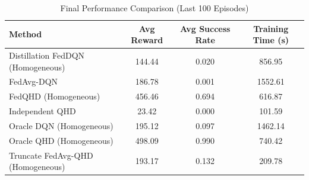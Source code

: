 \begin{table}[t]
\centering
\caption{Final Performance Comparison (Last 100 Episodes)}
\label{tab:performance_summary}
\begin{tabular}{lccc}
\toprule
Method & Avg Reward & Avg Success Rate & Training Time (s) \\
\midrule
Distillation FedDQN (Homogeneous) & 144.44 & 0.020 & 856.95 \\
FedAvg-DQN & 186.78 & 0.001 & 1552.61 \\
FedQHD (Homogeneous) & 456.46 & 0.694 & 616.87 \\
Independent QHD & 23.42 & 0.000 & 101.59 \\
Oracle DQN (Homogeneous) & 195.12 & 0.097 & 1462.14 \\
Oracle QHD (Homogeneous) & 498.09 & 0.990 & 740.42 \\
Truncate FedAvg-QHD (Homogeneous) & 193.17 & 0.132 & 209.78 \\
\bottomrule
\end{tabular}
\end{table}